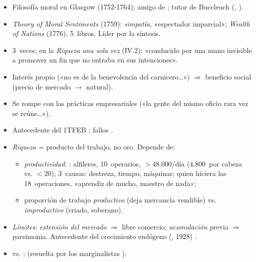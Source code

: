 \documentclass{article}
\begin{document}
\begin{columnas}
\begin{itemize}
\item Filosofía moral en Glasgow (1752-1764); amigo de ; tutor de Buccleuch (, ).
\item \emph{Theory of Moral Sentiments} (1759): \emph{simpatía}, «espectador imparcial»; \emph{Wealth of Nations} (1776), 5~libros. Líder por la síntesis.
\end{itemize}
\begin{itemize}
\item 3~veces; en la \emph{Riqueza} \emph{una sola vez} (IV.2): «conducido por una mano invisible a promover un fin que no entraba en sus intenciones».
\item Interés propio («no es de la benevolencia del carnicero\ldots») $\Rightarrow$ beneficio social (precio de mercado $\to$ natural).
\item Se rompe con las prácticas empresariales («la gente del mismo oficio rara vez se reúne\ldots»).
\item Antecedente del 1TFEB ; fallos .
\end{itemize}
\begin{itemize}
\item \emph{Riqueza} = producto del trabajo, no oro. Depende de:
  \begin{itemize}
  \item \emph{productividad}: : alfileres, 10~operarios, $>$48.000/día (4.800~por cabeza vs. $<$20); 3~causas: destreza, tiempo, máquinas; quien hiciera las 18~operaciones, «aprendiz de mucho, maestro de nada»;
  \item proporción de trabajo \emph{productivo} (deja mercancía vendible) vs. \emph{improductivo} (criado, soberano).
  \end{itemize}
\item \emph{Límites}: \emph{extensión del mercado} $\Rightarrow$ libre comercio; \emph{acumulación} previa $\Rightarrow$ parsimonia. Antecedente del crecimiento endógeno (, 1928) .
\end{itemize}
\begin{itemize}
\item {} vs. ;  (resuelta por los marginalistas ).

\end{itemize}
\end{columnas}
\end{document}
